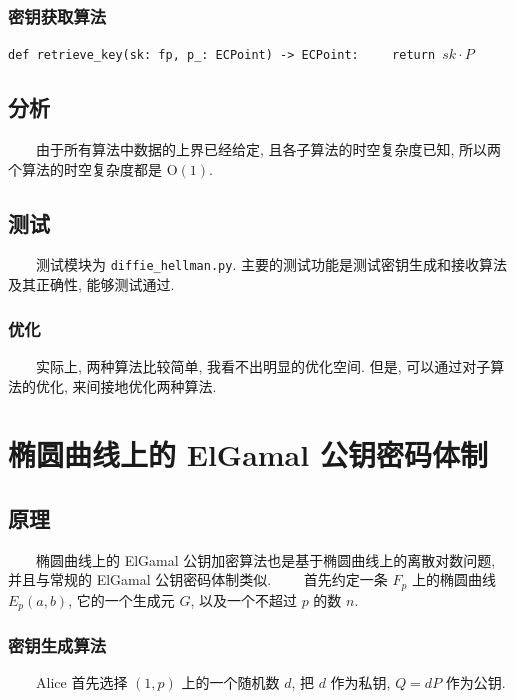 \documentclass[12pt,a4paper]{article}
\begin{document}
\subsubsection*{密钥获取算法}

\lstinline{def retrieve_key(sk: fp, p_: ECPoint) -> ECPoint:}
\newline
\lstinline{    return }$ {sk} \cdot P $

\subsection*{分析}

　　由于所有算法中数据的上界已经给定, 且各子算法的时空复杂度已知, 所以两个算法的时空复杂度都是 $ \mathrm{O}(1) $. 

\subsection*{测试}

　　测试模块为 \verb|diffie_hellman.py|. 主要的测试功能是测试密钥生成和接收算法及其正确性, 能够测试通过. 

\subsubsection*{优化}

　　实际上, 两种算法比较简单, 我看不出明显的优化空间. 但是, 可以通过对子算法的优化, 来间接地优化两种算法. 

\section*{椭圆曲线上的 ElGamal 公钥密码体制}

\subsection*{原理}

　　椭圆曲线上的 ElGamal 公钥加密算法也是基于椭圆曲线上的离散对数问题, 并且与常规的 ElGamal 公钥密码体制类似. 
\newline
　　首先约定一条 $ F_p $ 上的椭圆曲线 $ E_p(a, b) $, 它的一个生成元 $ G $, 以及一个不超过 $ p $ 的数 $ n $.  

\subsubsection*{密钥生成算法}

　　Alice 首先选择 $ (1, p) $ 上的一个随机数 $ d $, 把 $ d $ 作为私钥, $ Q = d P $ 作为公钥. 
\end{document}

